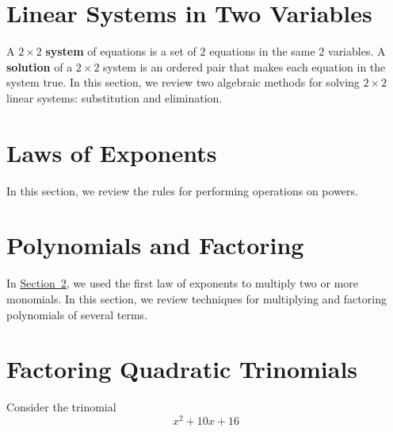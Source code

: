 \documentclass[10pt,]{book}
\newcommand{\terminology}[1]{\textbf{#1}}
\theoremstyle{plain}
\theoremstyle{definition}
\theoremstyle{definition}
\theoremstyle{definition}
\theoremstyle{definition}
\numberwithin{equation}{section}
\begin{document}
\section[Linear Systems in Two Variables]{Linear Systems in Two Variables}\label{appendix-Linear-Systems-in-Two-Variables}
\index{}A \(2\times 2\) \terminology{system} of equations is a set of \(2\) equations in the same \(2\) variables. A \terminology{solution} of a \(2\times 2\) system is an ordered pair that makes each equation in the system true. In this section, we review two algebraic methods for solving \(2\times 2\) linear systems: substitution and elimination.%
\typeout{************************************************}
\typeout{************************************************}
\section[Laws of Exponents]{Laws of Exponents}\label{appendix-Laws-of-Exponents}
\index{}In this section, we review the rules for performing operations on powers.%
\typeout{************************************************}
\typeout{************************************************}
\section[Polynomials and Factoring]{Polynomials and Factoring}\label{appendix-Polynomials-and-Factoring}
In \hyperref[appendix-Laws-of-Exponents]{Section~\ref{appendix-Laws-of-Exponents}}, we used the first law of exponents to multiply two or more monomials. In this section, we review techniques for multiplying and factoring polynomials of several terms.%
\typeout{************************************************}
\typeout{************************************************}
\section[Factoring Quadratic Trinomials]{Factoring Quadratic Trinomials}\label{appendix-Factoring-Quadratic-Trinomials}
Consider the trinomial
            \begin{equation*}
                x^2 + 10x + 16
            \end{equation*}
\typeout{************************************************}
\typeout{************************************************}
\end{document}
